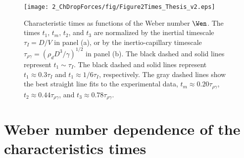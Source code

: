 \begin{figure}
	\centering
	\texttt{[image: 2\_ChDropForces/fig/Figure2Times\_Thesis\_v2.eps]}
	\caption{Characteristic times as functions of the Weber number $\Wen$. The times $t_1$, $t_m$, $t_2$, and $t_3$ are normalized by the inertial timescale $\tau_I = D/V$ in panel (a), or by the inertio-capillary timescale $\tau_{\rho\gamma} = (\rho_d D^3/\gamma)^{1/2}$ in panel (b). The black dashed and solid lines represent $t_1 \sim \tau_I$. The black dashed and solid lines represent $t_1 \approx 0.3\tau_I$ and $t_1 \approx 1/6\tau_I$, respectively. The gray dashed lines show  the best straight line fits to the experimental data, $t_m \approx 0.20\tau_{\rho\gamma}$, $t_2 \approx 0.44\tau_{\rho\gamma}$, and $t_3 \approx 0.78\tau_{\rho\gamma}$.}
	\label{Ch2:Fig2Times}
\end{figure}

\section{Weber number dependence of the characteristics times}\label{Ch2:SecTimes}

